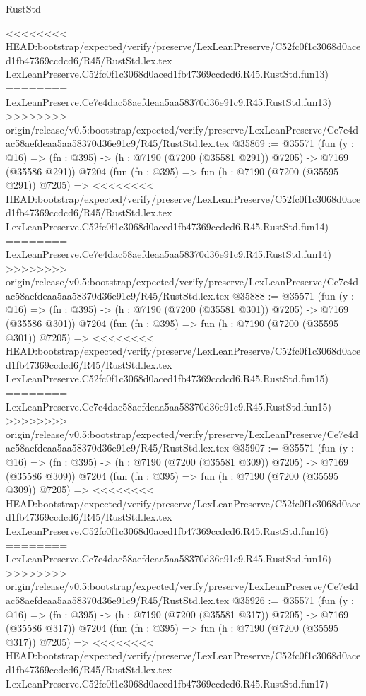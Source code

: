 \begin{lexlean}{RustStd}
\begin{coremodule}
{\begin{coremodule}
{{{{{{{{{{{{{{{{{{{{{{{{{{{{{{{{<<<<<<<< HEAD:bootstrap/expected/verify/preserve/LexLeanPreserve/C52fc0f1c3068d0aced1fb47369ccdcd6/R45/RustStd.lex.tex
    LexLeanPreserve.C52fc0f1c3068d0aced1fb47369ccdcd6.R45.RustStd.fun13)
========
    LexLeanPreserve.Ce7e4dac58aefdeaa5aa58370d36e91c9.R45.RustStd.fun13)
>>>>>>>> origin/release/v0.5:bootstrap/expected/verify/preserve/LexLeanPreserve/Ce7e4dac58aefdeaa5aa58370d36e91c9/R45/RustStd.lex.tex
@35869 := @35571
    (fun (y : @16) => (fn : @395) -> (h : @7190 (@7200 (@35581 @291)) @7205) -> @7169 (@35586 @291))
    @7204
    (fun (fn : @395) =>
    fun (h : @7190 (@7200 (@35595 @291)) @7205) =>
<<<<<<<< HEAD:bootstrap/expected/verify/preserve/LexLeanPreserve/C52fc0f1c3068d0aced1fb47369ccdcd6/R45/RustStd.lex.tex
    LexLeanPreserve.C52fc0f1c3068d0aced1fb47369ccdcd6.R45.RustStd.fun14)
========
    LexLeanPreserve.Ce7e4dac58aefdeaa5aa58370d36e91c9.R45.RustStd.fun14)
>>>>>>>> origin/release/v0.5:bootstrap/expected/verify/preserve/LexLeanPreserve/Ce7e4dac58aefdeaa5aa58370d36e91c9/R45/RustStd.lex.tex
@35888 := @35571
    (fun (y : @16) => (fn : @395) -> (h : @7190 (@7200 (@35581 @301)) @7205) -> @7169 (@35586 @301))
    @7204
    (fun (fn : @395) =>
    fun (h : @7190 (@7200 (@35595 @301)) @7205) =>
<<<<<<<< HEAD:bootstrap/expected/verify/preserve/LexLeanPreserve/C52fc0f1c3068d0aced1fb47369ccdcd6/R45/RustStd.lex.tex
    LexLeanPreserve.C52fc0f1c3068d0aced1fb47369ccdcd6.R45.RustStd.fun15)
========
    LexLeanPreserve.Ce7e4dac58aefdeaa5aa58370d36e91c9.R45.RustStd.fun15)
>>>>>>>> origin/release/v0.5:bootstrap/expected/verify/preserve/LexLeanPreserve/Ce7e4dac58aefdeaa5aa58370d36e91c9/R45/RustStd.lex.tex
@35907 := @35571
    (fun (y : @16) => (fn : @395) -> (h : @7190 (@7200 (@35581 @309)) @7205) -> @7169 (@35586 @309))
    @7204
    (fun (fn : @395) =>
    fun (h : @7190 (@7200 (@35595 @309)) @7205) =>
<<<<<<<< HEAD:bootstrap/expected/verify/preserve/LexLeanPreserve/C52fc0f1c3068d0aced1fb47369ccdcd6/R45/RustStd.lex.tex
    LexLeanPreserve.C52fc0f1c3068d0aced1fb47369ccdcd6.R45.RustStd.fun16)
========
    LexLeanPreserve.Ce7e4dac58aefdeaa5aa58370d36e91c9.R45.RustStd.fun16)
>>>>>>>> origin/release/v0.5:bootstrap/expected/verify/preserve/LexLeanPreserve/Ce7e4dac58aefdeaa5aa58370d36e91c9/R45/RustStd.lex.tex
@35926 := @35571
    (fun (y : @16) => (fn : @395) -> (h : @7190 (@7200 (@35581 @317)) @7205) -> @7169 (@35586 @317))
    @7204
    (fun (fn : @395) =>
    fun (h : @7190 (@7200 (@35595 @317)) @7205) =>
<<<<<<<< HEAD:bootstrap/expected/verify/preserve/LexLeanPreserve/C52fc0f1c3068d0aced1fb47369ccdcd6/R45/RustStd.lex.tex
    LexLeanPreserve.C52fc0f1c3068d0aced1fb47369ccdcd6.R45.RustStd.fun17)
}}}}}}}}}}}}}}}}}}}}}}}}}}}}}}}}
\end{coremodule}}
\end{coremodule}
\end{lexlean}
